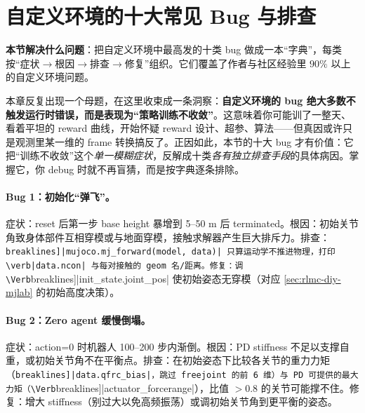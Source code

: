 \section{自定义环境的十大常见 Bug 与排查}
\label{sec:rlmc-diy-bugs}

\textbf{本节解决什么问题}：把自定义环境中最高发的十类 bug 做成一本“字典”，每类按“症状$\to$根因$\to$排查$\to$修复”组织。它们覆盖了作者与社区经验里 $90\%$ 以上的自定义环境问题。

\begin{insight}\label{ins:rlmc-diy-silentbug}
本章反复出现一个母题，在这里收束成一条洞察：\textbf{自定义环境的 bug 绝大多数不触发运行时错误，而是表现为“策略训练不收敛”}。这意味着你可能训了一整天、看着平坦的 reward 曲线，开始怀疑 reward 设计、超参、算法——但真因或许只是观测里某一维的 frame 转换搞反了。正因如此，本节的十大 bug 才有价值：它把“训练不收敛”这个\emph{单一模糊症状}，反解成十类\emph{各有独立排查手段}的具体病因。掌握它，你 debug 时就不再盲猜，而是按字典逐条排除。
\end{insight}

\paragraph{Bug 1：初始化“弹飞”。}症状：reset 后第一步 base height 暴增到 5--50 m 后 terminated。根因：初始关节角致身体部件互相穿模或与地面穿模，接触求解器产生巨大排斥力。排查：\Verb[breaklines]|mujoco.mj_forward(model, data)| 只算运动学不推进物理，打印 \verb|data.ncon| 与每对接触的 geom 名/距离。修复：调 \Verb[breaklines]|init_state.joint_pos| 使初始姿态无穿模（对应 \cref{sec:rlmc-diy-mjlab} 的初始高度决策）。

\paragraph{Bug 2：Zero agent 缓慢倒塌。}症状：action=0 时机器人 100--200 步内渐倒。根因：PD stiffness 不足以支撑自重，或初始关节角不在平衡点。排查：在初始姿态下比较各关节的重力力矩（\Verb[breaklines]|data.qfrc_bias|，跳过 freejoint 的前 6 维）与 PD 可提供的最大力矩（\Verb[breaklines]|actuator_forcerange|），比值 $>0.8$ 的关节可能撑不住。修复：增大 stiffness（别过大以免高频振荡）或调初始关节角到更平衡的姿态。

